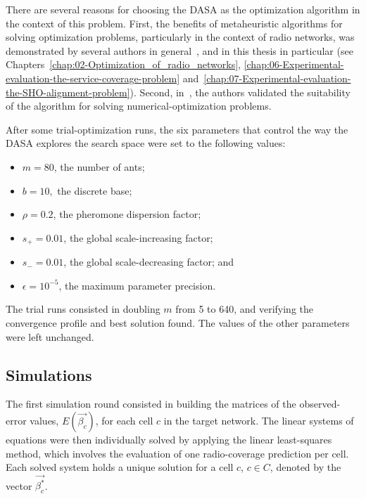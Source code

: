 There are several reasons for choosing the DASA as the optimization
algorithm in the context of this problem. First, the benefits of metaheuristic
algorithms for solving optimization problems, particularly in the
context of radio networks, was demonstrated by several authors in
general~\cite{Benedicic_Balancing_downlink_uplink_soft_handover_areas_in_UMTS_networks:2012,Garcia-Lozano_Metaheuristic_procedure_to_optimize_transmission_delays_in_DVB-T_single_frequency_networks:2011,Huang_Online_propagation_model_correction_based_on_PSO_algorithm_in_LTE_SON_system:2012,Malla_Energy_efficient_resource_allocation_in_OFDMA_networks_using_ant_colony_optimization:2012},
and in this thesis in particular (see Chapters~\ref{chap:02-Optimization_of_radio_networks},
\ref{chap:06-Experimental-evaluation-the-service-coverage-problem}
and~\ref{chap:07-Experimental-evaluation-the-SHO-alignment-problem}).
Second, in~\cite{korosec2010_DASA}, the authors validated the suitability
of the algorithm for solving numerical-optimization problems.

After some trial-optimization runs, the six parameters that control
the way the DASA explores the search space were set to the following
values:
\begin{itemize}
\item $m=80$, the number of ants;
\item $b=10,$ the discrete base;
\item $\rho=0.2$, the pheromone dispersion factor;
\item $s_{+}=0.01$, the global scale-increasing factor;
\item $s_{-}=0.01$, the global scale-decreasing factor; and 
\item $\epsilon=10^{-5}$, the maximum parameter precision.
\end{itemize}
The trial runs consisted in doubling $m$ from 5 to 640, and verifying
the convergence profile and best solution found. The values of the
other parameters were left unchanged.


\subsection{Simulations \label{sub:05-Simulations}}

The first simulation round consisted in building the matrices of the
observed-error values, $E(\vec{\beta_{c}})$, for each cell $c$ in
the target network. The linear systems of equations were then individually
solved by applying the linear least-squares method, which involves
the evaluation of one radio-coverage prediction per cell. Each solved
system holds a unique solution for a cell $c$, $c\in C$, denoted
by the vector $\vec{\beta_{c}^{*}}$.

